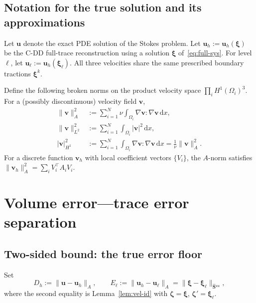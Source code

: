 \documentclass[11pt,a4paper]{article}
\theoremstyle{definition}
\newcommand{\pore}[1]{\Omega_{#1}}
\newcommand{\vel}{\bm{u}}
\newcommand{\Schur}{\mathbf{S}}
\newcommand{\Shatuu}{\widehat{\Schur}{}^{uu}}
\begin{document}
\subsection{Notation for the true solution and its approximations}

Let $\vel$ denote the exact PDE solution of the Stokes problem.
Let $\vel_h := \vel_h(\bm{\xi})$ be the C-DD full-trace reconstruction
using a solution $\bm{\xi}$ of~\eqref{eq:full-sys}.
For level $\ell$, let $\vel_\ell := \vel_h(\bm{\xi}_\ell)$.
All three velocities share the same prescribed boundary tractions
$\bm{\xi}^k$.

Define the following broken norms on the product velocity space
$\prod_i H^1(\pore{i})^3$.  For a (possibly discontinuous) velocity
field $\bm{v}$,
\begin{align}
  \|\bm{v}\|_A^2 &:= \sum_{i=1}^N \nu\int_{\pore{i}}
                     \nabla\bm{v}:\nabla\bm{v}\,\mathrm{d}x,
                     \label{eq:A-norm} \\[4pt]
  \|\bm{v}\|_{L^2}^2 &:= \sum_{i=1}^N \int_{\pore{i}}
                         |\bm{v}|^2\,\mathrm{d}x, \label{eq:L2-norm} \\[4pt]
  |\bm{v}|_{H^1}^2 &:= \sum_{i=1}^N \int_{\pore{i}}
                        \nabla\bm{v}:\nabla\bm{v}\,\mathrm{d}x
                        = \frac{1}{\nu}\|\bm{v}\|_A^2. \label{eq:H1-semi}
\end{align}
For a discrete function $\bm{v}_h$ with local coefficient vectors
$\{V_i\}$, the $A$-norm satisfies
$\|\bm{v}_h\|_A^2 = \sum_i V_i^\top A_i V_i$.

\section{Volume error---trace error separation}

\subsection{Two-sided bound: the true error floor}

Set
\begin{equation}\label{eq:DE}
  D_h := \|\vel - \vel_h\|_A,\qquad
  E_\ell := \|\vel_h - \vel_\ell\|_A
          = \|\bm{\xi} - \bm{\xi}_\ell\|_{\Shatuu},
\end{equation}
where the second equality is Lemma~\ref{lem:vel-id} with
$\bm{\zeta}=\bm{\xi}$, $\bm{\zeta}'=\bm{\xi}_\ell$.
\end{document}
